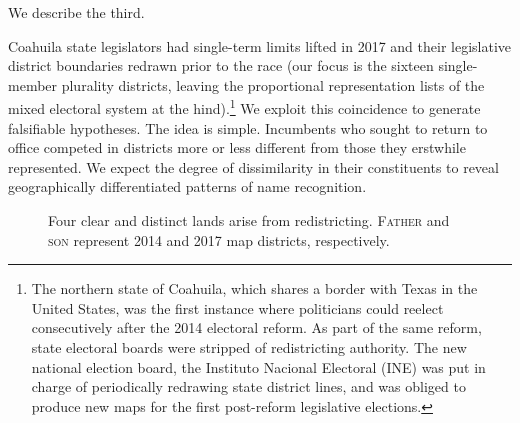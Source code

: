 \documentclass[letter,12pt]{article}
\begin{document}
\noindent We describe the third.

Coahuila state legislators had single-term limits lifted in 2017 and their legislative district boundaries redrawn prior to the race (our focus is the sixteen single-member plurality districts, leaving the proportional representation lists of the mixed electoral system at the hind).\footnote{The northern state of Coahuila, which shares a border with Texas in the United States, was the first instance where politicians could reelect consecutively after the 2014 electoral reform. As part of the same reform, state electoral boards were stripped of redistricting authority. The new national election board, the Instituto Nacional Electoral (INE) was put in charge of periodically redrawing state district lines, and was obliged to produce new maps for the first post-reform legislative elections.} We exploit this coincidence to generate falsifiable hypotheses. The idea is simple. Incumbents who sought to return to office competed in districts more or less different from those they erstwhile represented. We expect the degree of dissimilarity in their constituents to reveal geographically differentiated patterns of name recognition. 

\begin{figure}
  \centering
    \usetikzlibrary{calc}
    \caption{Four clear and distinct lands arise from redistricting. \textsc{Father} and \textsc{son} represent 2014 and 2017 map districts, respectively.}\label{F:venn}
\end{figure}
\end{document}
